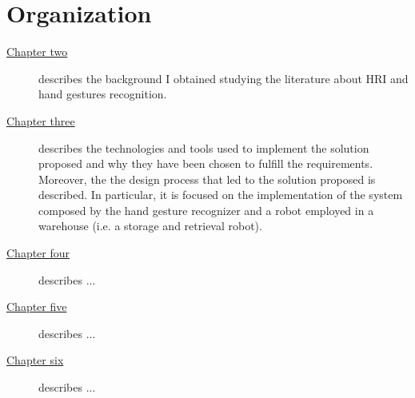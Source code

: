 \documentclass[../thesis.tex]{subfiles}
\begin{document}
\section{Organization}\label{s:organization}
\begin{description}
    \item[{\hyperref[cap:theory]{Chapter two}}] describes the background I obtained studying the literature about \acrlong{HRI} and hand gestures recognition.
    \item[{\hyperref[cap:methods]{Chapter three}}] describes the technologies and tools used to implement the solution proposed and why they have been chosen to fulfill the requirements. Moreover, the the design process that led to the solution proposed is described. In particular, it is focused on the implementation of the system composed by the hand gesture recognizer and a robot employed in a warehouse (i.e. a storage and retrieval robot).
    \item[{\hyperref[cap:results]{Chapter four}}] describes ...
    \item[{\hyperref[cap:discussion]{Chapter five}}] describes ...
    \item[{\hyperref[cap:conclusion]{Chapter six}}] describes ...
\end{description}
\end{document}
